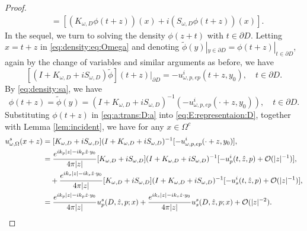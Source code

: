 \documentclass[a4paper,11pt]{article}
\theoremstyle{remark}
\theoremstyle{definition}
\numberwithin{equation}{section}
\begin{document}
\begin{proof}
\begin{align}
      & = [(K_{\omega,D}\phi(t+z))(x)+ i(S_{\omega,D}\phi(t+z))(x)].\label{eq:E:representaion:D}
   \end{align}
   In the sequel, we turn to solving the density $\phi(z+t)$ with $t \in \partial D$.
   Letting $x = t+z$ in \eqref{eq:density:eq:Omega} and denoting $\tilde \phi(y)|_{y\in\partial D} = \phi(t+z)|_{t \in \partial D}$, again by the change of variables and similar arguments as before, we have
   \begin{equation}\label{eq:density:sa}
     [(I + K_{\omega,D} + iS_{\omega,D})\tilde \phi](t+z)|_{\partial D} = - u_{\omega,p,ep}^i(t+z, y_0), \quad t \in \partial D.
   \end{equation}
   By \eqref{eq:density:sa}, we have
   \begin{equation}\label{eq:a:trans:D:a}
   \phi(t+z) = \tilde \phi(y) = (I + K_{\omega,D} + i S_{\omega,D})^{-1}(- u_{\omega,p, ep}^i(\cdot+z, y_0)), \quad t \in \partial D.
   \end{equation}
   Substituting $\phi(t+z)$ in \eqref{eq:a:trans:D:a} into \eqref{eq:E:representaion:D}, together with Lemma \ref{lem:incident}, we have for any $x \in \Omega^c$
   \begin{align}
     u_{\omega,\Omega}^s(x+z) &= [K_{\omega,D} + iS_{\omega,D}]  (I + K_{\omega,D} + i S_{\omega,D})^{-1}[-  u_{\omega,p,ep}^i(\cdot+z,y_0)], \notag \\
     &= \frac{e^{ik_p|z|-ik_p\hat{z} \cdot y_0}}{4 \pi |z|}  [K_{\omega,D} + iS_{\omega,D}]  (I + K_{\omega,D} + i S_{\omega,D})^{-1}[- u_{p}^{i}(t,\hat{z},p)+ \mathcal{O}(|z|^{-1})], \notag \\
     & \quad +\frac{e^{ik_s|z|-ik_s\hat{z} \cdot y_0}}{4 \pi |z|}  [K_{\omega,D} + iS_{\omega,D}]  (I + K_{\omega,D} + i S_{\omega,D})^{-1}[- u_{s}^{i}(t,\hat{z},p)+ \mathcal{O}(|z|^{-1})], \notag  \\
     &= \frac{e^{ik_p|z|-ik_p\hat{z} \cdot y_0}}{4 \pi |z|}u_{p}^s(D,\hat{z},p;x) + \frac{e^{ik_s|z|-ik_s\hat{z} \cdot y_0}}{4 \pi |z|}u_{s}^s(D,\hat{z},p;x)+ \mathcal{O}(|z|^{-2}). \label{eq:asym:rigid:twp}

\end{align}
\end{proof}
\end{document}
